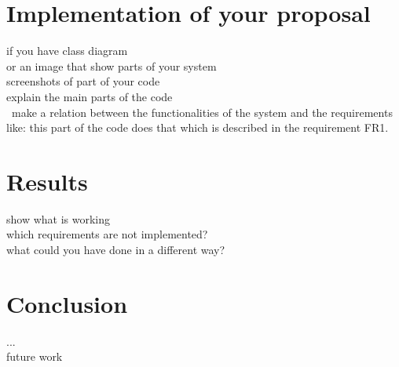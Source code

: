 \section{Implementation of your proposal}
\label{sec:4}
   if you have class diagram
\\ or an image that show parts of your system
\\ screenshots of part of your code
\\ explain the main parts of the code
\\ make a relation between the functionalities of the system and the requirements
\\ like: this part of the code does that which is described in the requirement FR1.

\section{Results}
\label{sec:5}
   show what is working
\\ which requirements are not implemented?
\\ what could you have done in a different way?

\section{Conclusion}
\label{sec:5}
...
\\ future work

\newpage

